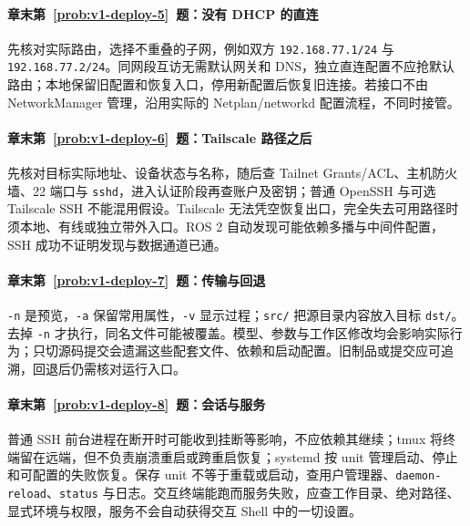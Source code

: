 \paragraph*{章末第~\ref{prob:v1-deploy-5}~题：没有 DHCP 的直连}
\begin{solution}
先核对实际路由，选择不重叠的子网，例如双方 \texttt{192.168.77.1/24} 与 \texttt{192.168.77.2/24}。同网段互访无需默认网关和 DNS，独立直连配置不应抢默认路由；本地保留旧配置和恢复入口，停用新配置后恢复旧连接。若接口不由 NetworkManager 管理，沿用实际的 Netplan/networkd 配置流程，不同时接管。
\end{solution}

\paragraph*{章末第~\ref{prob:v1-deploy-6}~题：Tailscale 路径之后}
\begin{solution}
先核对目标实际地址、设备状态与名称，随后查 Tailnet Grants/ACL、主机防火墙、22 端口与 \texttt{sshd}，进入认证阶段再查账户及密钥；普通 OpenSSH 与可选 Tailscale SSH 不能混用假设。Tailscale 无法凭空恢复出口，完全失去可用路径时须本地、有线或独立带外入口。ROS 2 自动发现可能依赖多播与中间件配置，SSH 成功不证明发现与数据通道已通。
\end{solution}

\paragraph*{章末第~\ref{prob:v1-deploy-7}~题：传输与回退}
\begin{solution}
\texttt{-n} 是预览，\texttt{-a} 保留常用属性，\texttt{-v} 显示过程；\texttt{src/} 把源目录内容放入目标 \texttt{dst/}。去掉 \texttt{-n} 才执行，同名文件可能被覆盖。模型、参数与工作区修改均会影响实际行为；只切源码提交会遗漏这些配套文件、依赖和启动配置。旧制品或提交应可追溯，回退后仍需核对运行入口。
\end{solution}

\paragraph*{章末第~\ref{prob:v1-deploy-8}~题：会话与服务}
\begin{solution}
普通 SSH 前台进程在断开时可能收到挂断等影响，不应依赖其继续；tmux 将终端留在远端，但不负责崩溃重启或跨重启恢复；systemd 按 unit 管理启动、停止和可配置的失败恢复。保存 unit 不等于重载或启动，查用户管理器、\texttt{daemon-reload}、\texttt{status} 与日志。交互终端能跑而服务失败，应查工作目录、绝对路径、显式环境与权限，服务不会自动获得交互 Shell 中的一切设置。
\end{solution}

